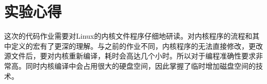 \documentclass[UTF8]{ctexrep}
\begin{document}
    \section{实验心得}
    这次的代码作业需要对Linux的内核文件程序仔细地研读。对内核程序的流程和其中定义的宏有了更深的理解。与之前的作业不同，内核程序的无法直接修改，更改源文件后，要对内核重新编译，耗时会高达几个小时。所以对于编程准确性要求非常高。同时内核编译中会占用很大的硬盘空间，因此掌握了临时增加磁盘空间的技术。
\end{document}

